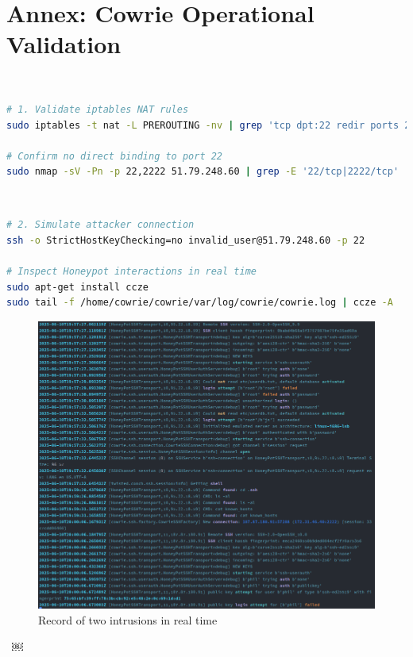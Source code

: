 \section{Annex: Cowrie Operational Validation}  
\label{annex:cowrie-validation}  
\
\
\begin{lstlisting}[language=bash,label={lst:cowrie-redirect},caption={Traffic Redirection Verification}]  
# 1. Validate iptables NAT rules  
sudo iptables -t nat -L PREROUTING -nv | grep 'tcp dpt:22 redir ports 2222'  

# Confirm no direct binding to port 22  
sudo nmap -sV -Pn -p 22,2222 51.79.248.60 | grep -E '22/tcp|2222/tcp'  
\end{lstlisting}  
\
\begin{lstlisting}[language=bash,label={lst:cowrie-access},caption={Honeypot Engagement Testing}]  
# 2. Simulate attacker connection  
ssh -o StrictHostKeyChecking=no invalid_user@51.79.248.60 -p 22  

# Inspect Honeypot interactions in real time  
sudo apt-get install ccze
sudo tail -f /home/cowrie/cowrie/var/log/cowrie/cowrie.log | ccze -A  
\end{lstlisting}  
\begin{figure}[h!]
    \centering
    \includegraphics[width=1\linewidth]{doc/img/annex_c_listing_2.png}
    \caption*{Record of two intrusions in real time}
\end{figure}

\
￼

\
